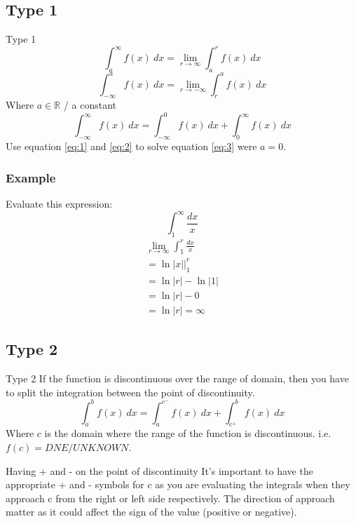 \documentclass[letterpaper,10pt,twoside,twocolumn,openany]{book}
\begin{document}
\subsection{Type 1}
\begin{DndSidebar}{Type 1}
    \begin{equation} \label{eq:1}
        \int_a^\infty f(x)\ dx = \lim_{r \to \infty} \int_a^r f(x)\ dx
    \end{equation}
    \begin{equation} \label{eq:2}
        \int_{-\infty}^a f(x)\ dx = \lim_{r \to -\infty} \int_r^a f(x)\ dx
    \end{equation}
    {\center Where $a\in \mathbb{R}$ / a constant} 
    \begin{equation} \label{eq:3}
        \int_{-\infty}^\infty f(x)\ dx = \int_{-\infty}^0 f(x)\ dx + \int_0^\infty f(x)\ dx 
    \end{equation}
    Use equation \ref{eq:1} and \ref{eq:2} to solve equation \ref{eq:3} were $a = 0$.
\end{DndSidebar}
\newpage
\subsubsection{Example}
Evaluate this expression:
$$ \int_1^\infty \frac{dx}{x}$$
\begin{gather*}
    \lim_{r\to \infty} \int_1^r \frac{dx}{x}\\ 
    = \ln|x|\biggl|_1^r\\ 
    = \ln|r| - \ln|1|\\ 
    = \ln|r| - 0\\ 
    = \ln|r| = \infty
\end{gather*}


\subsection{Type 2}
\begin{DndSidebar}{Type 2}
    If the function is discontinuous over the range of domain, then you have to split the integration between the point of discontinuity.
    \begin{equation}
        \int_{a}^b f(x)\ dx = \int_{a}^{c^-} f(x)\ dx + \int_{c^+}^b f(x)\ dx 
    \end{equation}
    Where $c$ is the domain where the range of the function is discontinuous. i.e. $f(c) = DNE/UNKNOWN$.
\end{DndSidebar}
\begin{DndComment}{Having + and - on the point of discontinuity}
    It's important to have the appropriate + and - symbols for $c$ as you are evaluating the integrals when they approach c from the right or left side respectively. The direction of approach matter as it could affect the sign of the value (positive or negative).
\end{DndComment}
\end{document}
